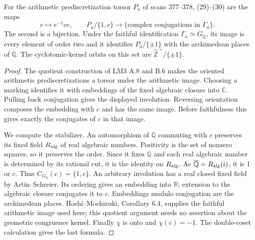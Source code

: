 \begin{proposition}
\label{C-prediscretizations}
For the arithmetic prediscretization torsor $P_a$
of scans 377--378, (29)--(30) are the maps
\[
 e\longmapsto e^{-1}ce,\qquad
 P_a/\{1,c\}\longrightarrow
 \{\text{complex conjugations in }\Gamma_a\}.
\]
The second is a bijection. Under the faithful
identification $\Gamma_a\simeq G_{\mathbb Q}$, its
image is every element of order two and it
identifies $P_a/\{\pm1\}$ with the archimedean
places of $\overline{\mathbb Q}$.
The cyclotomic-kernel orbits on this set are
$\widehat{\mathbb Z}^{\,\times}/\{\pm1\}$.
\end{proposition}
\begin{proof}
The quotient construction of LM3 A.8 and B.6 makes
the oriented arithmetic prediscretizations a torsor
under the arithmetic image. Choosing a marking
identifies it with embeddings of the fixed algebraic
closure into $\mathbb C$. Pulling back conjugation
gives the displayed involution. Reversing orientation
composes the embedding with $c$ and has the same
image. Before faithfulness this gives exactly the
conjugates of $c$ in that image.

We compute the stabilizer. An automorphism of
$\overline{\mathbb Q}$ commuting with $c$ preserves
its fixed field $R_{\rm alg}$ of real algebraic
numbers. Positivity is the set of nonzero squares,
so it preserves the order. Since it fixes
$\mathbb Q$ and each real algebraic number is
determined by its rational cut, it is the
identity on $R_{\rm alg}$. As
$\overline{\mathbb Q}=R_{\rm alg}(i)$, it is
$1$ or $c$. Thus $C_{G_{\mathbb Q}}(c)=\{1,c\}$.
An arbitrary involution has a real closed fixed
field by Artin--Schreier. Its ordering gives an
embedding into $\mathbb R$; extension to the
algebraic closure conjugates it to $c$.
Embeddings modulo conjugation are the archimedean
places. Hoshi--Mochizuki, Corollary 6.4, supplies
the faithful arithmetic image used here; this
quotient argument needs no assertion about the
geometric congruence kernel.
Finally $\chi$ is onto and $\chi(c)=-1$.
The double-coset calculation gives the last formula.
\end{proof}

